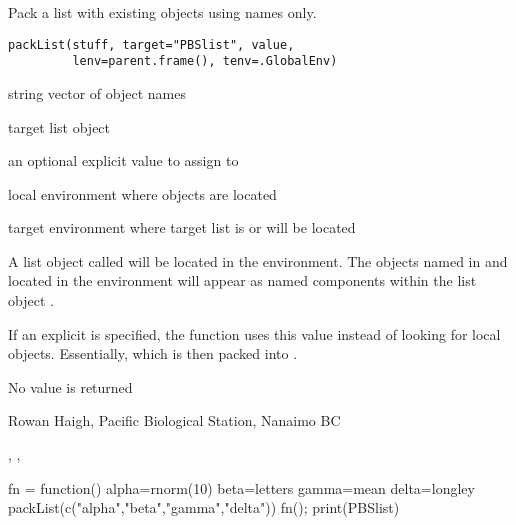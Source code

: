 \documentclass[letterpaper]{book}
\begin{document}
\begin{Description}\relax
Pack a list with existing objects using names only.
\end{Description}
\begin{Usage}
\begin{verbatim}
packList(stuff, target="PBSlist", value, 
         lenv=parent.frame(), tenv=.GlobalEnv)
\end{verbatim}
\end{Usage}
\begin{Arguments}
\begin{ldescription}
\item[\code{stuff}] string vector of object names 
\item[\code{target}] target list object 
\item[\code{value}] an optional explicit value to assign to  
\item[\code{lenv}] local environment where objects are located 
\item[\code{tenv}] target environment where target list is or will be located 
\end{ldescription}
\end{Arguments}
\begin{Details}\relax
A list object called  will be located in the 
 environment. The objects named in  and 
located in the  environment will appear as named 
components within the list object .

If an explicit  is specified, the function uses this value
instead of looking for local objects. Essentially, 
which is then packed into .
\end{Details}
\begin{Value}
No value is returned
\end{Value}
\begin{Author}\relax
Rowan Haigh, Pacific Biological Station, Nanaimo BC
\end{Author}
\begin{SeeAlso}\relax
{}, , 
\end{SeeAlso}
\begin{Examples}
\begin{ExampleCode}
fn = function() {
        alpha=rnorm(10)
        beta=letters
        gamma=mean
        delta=longley
        packList(c("alpha","beta","gamma","delta")) }
fn(); print(PBSlist)
\end{ExampleCode}
\end{Examples}
\end{document}
